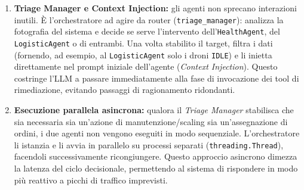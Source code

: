 \begin{enumerate}
    \item \textbf{Triage Manager e Context Injection:} gli agenti non sprecano interazioni inutili. È l'orchestratore ad agire da router (\texttt{triage\_manager}): analizza la fotografia del sistema e decide se serve l'intervento dell'\texttt{HealthAgent}, del \texttt{LogisticAgent} o di entrambi. Una volta stabilito il target, filtra i dati (fornendo, ad esempio, al \texttt{LogisticAgent} solo i droni \texttt{IDLE}) e li inietta direttamente nel prompt iniziale dell'agente (\textit{Context Injection}). Questo costringe l'LLM a passare immediatamente alla fase di invocazione dei tool di rimediazione, evitando passaggi di ragionamento ridondanti.

    \item \textbf{Esecuzione parallela asincrona:} qualora il \textit{Triage Manager} stabilisca che sia necessaria sia un'azione di manutenzione/scaling sia un'assegnazione di ordini, i due agenti non vengono eseguiti in modo sequenziale. L'orchestratore li istanzia e li avvia in parallelo su processi separati (\texttt{threading.Thread}), facendoli successivamente ricongiungere. Questo approccio asincrono dimezza la latenza del ciclo decisionale, permettendo al sistema di rispondere in modo più reattivo a picchi di traffico imprevisti.
\end{enumerate}
